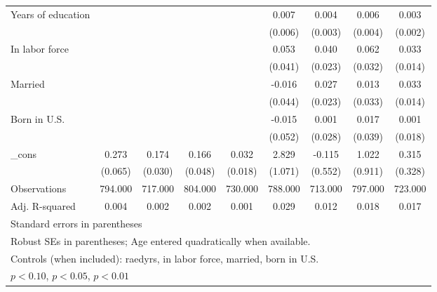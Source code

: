 \begin{table}[htbp]
\begin{tabular}{l*{8}{c}}
Years of education&                  &                  &                  &                  &    0.007         &    0.004         &    0.006         &    0.003         \\
          &                  &                  &                  &                  &  (0.006)         &  (0.003)         &  (0.004)         &  (0.002)         \\
In labor force&                  &                  &                  &                  &    0.053         &    0.040\sym{*}  &    0.062\sym{*}  &    0.033\sym{**} \\
          &                  &                  &                  &                  &  (0.041)         &  (0.023)         &  (0.032)         &  (0.014)         \\
Married   &                  &                  &                  &                  &   -0.016         &    0.027         &    0.013         &    0.033\sym{**} \\
          &                  &                  &                  &                  &  (0.044)         &  (0.023)         &  (0.033)         &  (0.014)         \\
Born in U.S.&                  &                  &                  &                  &   -0.015         &    0.001         &    0.017         &    0.001         \\
          &                  &                  &                  &                  &  (0.052)         &  (0.028)         &  (0.039)         &  (0.018)         \\
\_cons    &    0.273\sym{***}&    0.174\sym{***}&    0.166\sym{***}&    0.032\sym{*}  &    2.829\sym{***}&   -0.115         &    1.022         &    0.315         \\
          &  (0.065)         &  (0.030)         &  (0.048)         &  (0.018)         &  (1.071)         &  (0.552)         &  (0.911)         &  (0.328)         \\
\midrule
Observations&  794.000         &  717.000         &  804.000         &  730.000         &  788.000         &  713.000         &  797.000         &  723.000         \\
Adj. R-squared&    0.004         &    0.002         &    0.002         &    0.001         &    0.029         &    0.012         &    0.018         &    0.017         \\
\bottomrule
\multicolumn{9}{l}{\footnotesize Standard errors in parentheses}\\
\multicolumn{9}{l}{\footnotesize Robust SEs in parentheses; Age entered quadratically when available.}\\
\multicolumn{9}{l}{\footnotesize Controls (when included): raedyrs, in labor force, married, born in U.S.}\\
\multicolumn{9}{l}{\footnotesize \sym{*} \(p<0.10\), \sym{**} \(p<0.05\), \sym{***} \(p<0.01\)}\\
\end{tabular}
\end{table}
